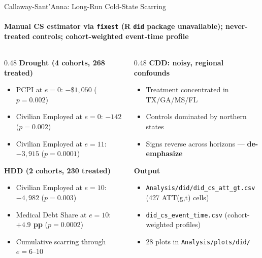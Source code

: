 \documentclass[aspectratio=169,11pt]{beamer}
\newcommand{\emphcolor}[1]{{\color{WarmOrange}\textbf{#1}}}
\newcommand{\tealtext}[1]{{\color{Teal}#1}}
\begin{document}
\begin{frame}{Callaway-Sant'Anna: Long-Run Cold-State Scarring}
  \framesubtitle{Manual CS estimator via \texttt{fixest} (R \texttt{did} package unavailable); never-treated controls; cohort-weighted event-time profile}
  \begin{columns}[T]
    \begin{column}{0.48\textwidth}
      \textbf{\tealtext{Drought (4 cohorts, 268 treated)}}
      \begin{itemize}\itemsep0.12em
        \item PCPI at \(e=0\): \emphcolor{\(-\$1{,}050\)} (\(p=0.002\))
        \item Civilian Employed at \(e=0\): \(-142\) (\(p=0.002\))
        \item Civilian Employed at \(e=11\): \(-3{,}915\) (\(p=0.0001\))
      \end{itemize}
      \vspace{0.4em}
      \textbf{\tealtext{HDD (2 cohorts, 230 treated)}}
      \begin{itemize}\itemsep0.12em
        \item Civilian Employed at \(e=10\): \emphcolor{\(-4{,}982\)} (\(p=0.003\))
        \item Medical Debt Share at \(e=10\): \emphcolor{\(+4.9\) pp} (\(p=0.0002\))
        \item Cumulative scarring through \(e=6\)--10
      \end{itemize}
    \end{column}
    \begin{column}{0.48\textwidth}
      \textbf{\tealtext{CDD: noisy, regional confounds}}
      \begin{itemize}\itemsep0.12em
        \item Treatment concentrated in TX/GA/MS/FL
        \item Controls dominated by northern states
        \item Signs reverse across horizons --- \emphcolor{de-emphasize}
      \end{itemize}
      \vspace{0.4em}
      \textbf{\tealtext{Output}}
      \begin{itemize}\itemsep0.12em
        \item \texttt{Analysis/did/did\_cs\_att\_gt.csv} (427 ATT(g,t) cells)
        \item \texttt{did\_cs\_event\_time.csv} (cohort-weighted profiles)
        \item 28 plots in \texttt{Analysis/plots/did/}
      \end{itemize}
    \end{column}
  \end{columns}
\end{frame}
\end{document}
